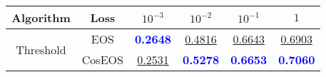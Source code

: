 \begin{table}[t]
\centering
\begin{tabularx}{.7\textwidth}{c|c|cccc}
\bf Algorithm & \bf Loss & $10^{-3}$ & $10^{-2}$ & $10^{-1}$ & $1$\\\hline\hline
\multirow{2}{*}{Threshold} & EOS & \textcolor{blue}{\bf 0.2648} & \underline{0.4816} & \underline{0.6643} & \underline{0.6903}\\
 & CosEOS & \underline{0.2531} & \textcolor{blue}{\bf 0.5278} & \textcolor{blue}{\bf 0.6653} & \textcolor{blue}{\bf 0.7060}\\
\hline
\end{tabularx}
\end{table}